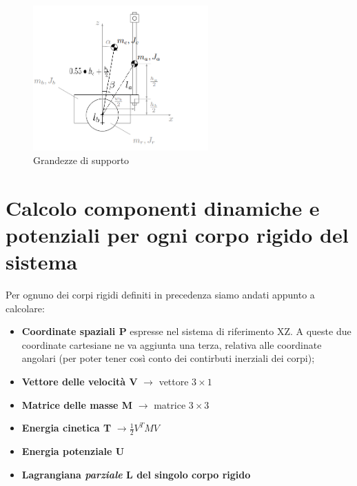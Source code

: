 \begin{figure}[h]
	\centering   	
	\includegraphics[width=0.6\textwidth]{Immagini/VAB_additionalMeasures.png}
	\caption{Grandezze di supporto}
	\label{fig:VAB_lunghezze}
\end{figure}

\section{Calcolo componenti dinamiche e potenziali per ogni corpo rigido del sistema}
Per ognuno dei corpi rigidi definiti in precedenza siamo andati appunto a calcolare:

\begin{itemize}
	\item \textbf{Coordinate spaziali P} espresse nel sistema di riferimento XZ. A queste due coordinate cartesiane ne va aggiunta una terza, relativa alle coordinate angolari (per poter tener così conto dei contirbuti inerziali dei corpi);
	\item \textbf{Vettore delle velocità V} $\rightarrow$ vettore $3\times 1$
	\item \textbf{Matrice delle masse M} $\rightarrow$ matrice $3\times 3$
	\item \textbf{Energia cinetica T} $\rightarrow \frac{1}{2} V^T M V$
	\item \textbf{Energia potenziale U}
	\item \textbf{Lagrangiana \textit{parziale} L del singolo corpo rigido}
\end{itemize}

